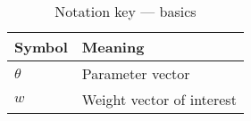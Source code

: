 
\begin{table}[h!] \centering
\caption{Notation key --- basics\label{tab:basic_notation}}
\begin{tabular}{|l|l|}\hline
Symbol  & Meaning \\ \hline\hline
$\theta$                & Parameter vector \\ \hline
$w$                     & Weight vector of interest \\ \hline
\end{tabular}
\end{table}
